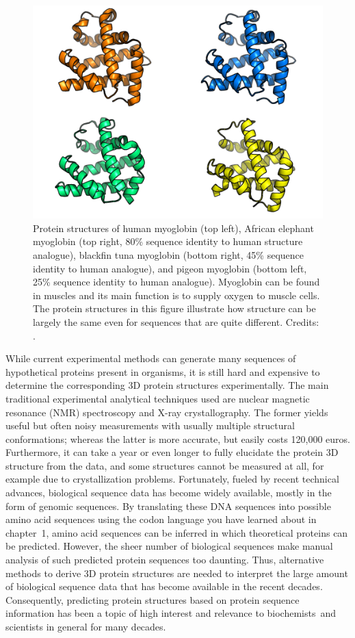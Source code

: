 \begin{figure}[!htbp]
\centering
\includegraphics[width=0.8\linewidth]{files/myoglobin-3a26c60b663bcd193d194d3391d896b0.png}
\caption[]{Protein structures of human myoglobin (top left), African elephant myoglobin (top right, 80\% sequence identity to human structure analogue), blackfin tuna myoglobin (bottom right, 45\% sequence identity to human analogue), and pigeon myoglobin (bottom left, 25\% sequence identity to human analogue).
Myoglobin can be found in muscles and its main function is to supply oxygen to muscle cells.
The protein structures in this figure illustrate how structure can be largely the same even for sequences that are quite different.
Credits: \cite{blopig_2021}.}
\label{myoglobin}
\end{figure}

While current experimental methods can generate many sequences of hypothetical proteins present in organisms, it is still hard and expensive to determine the corresponding 3D protein structures experimentally.
The main traditional experimental analytical techniques used are nuclear magnetic resonance (NMR) spectroscopy and X-ray crystallography.
The former yields useful but often noisy measurements with usually multiple structural conformations; whereas the latter is more accurate, but easily costs 120,000 euros. Furthermore, it can take a year or even longer to fully elucidate the protein 3D structure from the data, and some structures cannot be measured at all, for example due to crystallization problems.
Fortunately, fueled by recent technical advances, biological sequence data has become widely available, mostly in the form of genomic sequences.
By translating these DNA sequences into possible amino acid sequences using the codon language you have learned about in chapter~1, amino acid sequences can be inferred in which theoretical proteins can be predicted.
However, the sheer number of biological sequences make manual analysis of such predicted protein sequences too daunting. Thus, alternative methods to derive 3D protein structures are needed to interpret the large amount of biological sequence data that has become available in the recent decades.
Consequently, predicting protein structures based on protein sequence information has been a topic of high interest and relevance to biochemists~and scientists in general for many decades.

